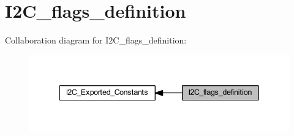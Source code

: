 \hypertarget{group___i2_c__flags__definition}{}\section{I2\+C\+\_\+flags\+\_\+definition}
\label{group___i2_c__flags__definition}
Collaboration diagram for I2\+C\+\_\+flags\+\_\+definition\+:
\nopagebreak
\begin{figure}[H]
\begin{center}
\leavevmode
\includegraphics[width=341pt]{group___i2_c__flags__definition}
\end{center}
\end{figure}
